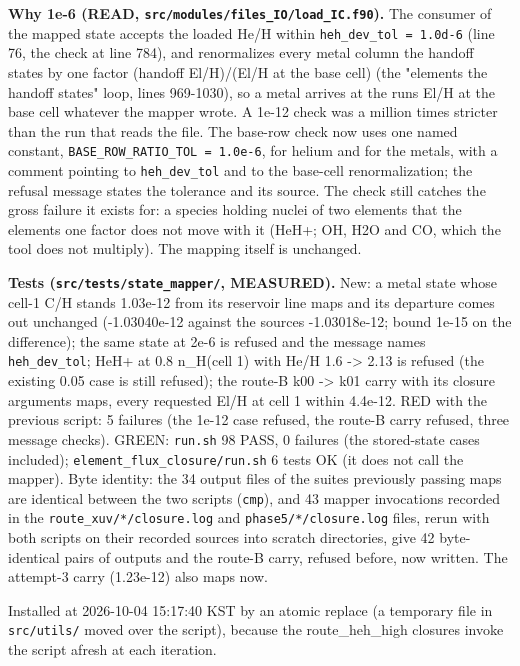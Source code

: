 \documentclass[english,a4paper]{my_memo}
\begin{document}
\textbf{Why 1e-6 (READ, \texttt{src/modules/files\_IO/load\_IC.f90}).} The consumer of the
mapped state accepts the loaded He/H within \texttt{heh\_dev\_tol\ =\ 1.0d-6} (line 76,
the check at line 784), and renormalizes every metal column the handoff
states by one factor (handoff El/H)/(El/H at the base cell) (the "elements
the handoff states" loop, lines 969-1030), so a metal arrives at the run\textquotesingle s
El/H at the base cell whatever the mapper wrote. A 1e-12 check was a
million times stricter than the run that reads the file. The base-row check
now uses one named constant, \texttt{BASE\_ROW\_RATIO\_TOL\ =\ 1.0e-6}, for helium and
for the metals, with a comment pointing to \texttt{heh\_dev\_tol} and to the
base-cell renormalization; the refusal message states the tolerance and its
source. The check still catches the gross failure it exists for: a species
holding nuclei of two elements that the element\textquotesingle s one factor does not move
with it (HeH+; OH, H2O and CO, which the tool does not multiply). The
mapping itself is unchanged.

\textbf{Tests (\texttt{src/tests/state\_mapper/}, MEASURED).} New: a metal state whose
cell-1 C/H stands 1.03e-12 from its reservoir line maps and its departure
comes out unchanged (-1.03040e-12 against the source\textquotesingle s -1.03018e-12; bound
1e-15 on the difference); the same state at 2e-6 is refused and the message
names \texttt{heh\_dev\_tol}; HeH+ at 0.8 n\_H(cell 1) with He/H 1.6 -\textgreater{} 2.13 is
refused (the existing 0.05 case is still refused); the route-B k00 -\textgreater{} k01
carry with its closure arguments maps, every requested El/H at cell 1 within
4.4e-12. RED with the previous script: 5 failures (the 1e-12 case refused,
the route-B carry refused, three message checks). GREEN: \texttt{run.sh} 98 PASS,
0 failures (the stored-state cases included); \texttt{element\_flux\_closure/run.sh}
6 tests OK (it does not call the mapper). Byte identity: the 34 output files
of the suite\textquotesingle s previously passing maps are identical between the two
scripts (\texttt{cmp}), and 43 mapper invocations recorded in the
\texttt{route\_xuv/*/closure.log} and \texttt{phase5/*/closure.log} files, rerun with both
scripts on their recorded sources into scratch directories, give 42
byte-identical pairs of outputs and the route-B carry, refused before, now
written. The attempt-3 carry (1.23e-12) also maps now.

Installed at 2026-10-04 15:17:40 KST by an atomic replace (a temporary file in
\texttt{src/utils/} moved over the script), because the route\_heh\_high closures
invoke the script afresh at each iteration.
\end{document}
